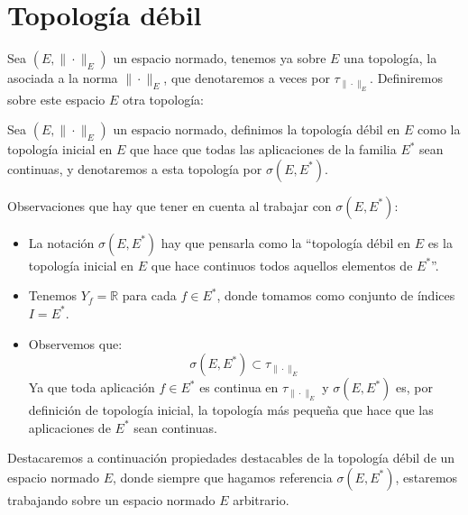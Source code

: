\section{Topología débil}
\noindent
Sea $(E,\|\cdot \|_E)$ un espacio normado, tenemos ya sobre $E$ una topología, la asociada a la norma $\|\cdot \|_E$, que denotaremos a veces por $\tau_{\|\cdot \|_E}$. Definiremos sobre este espacio $E$ otra topología:

\begin{definicion}
    Sea $(E,\|\cdot \|_E)$ un espacio normado, definimos la topología débil en $E$ como la topología inicial en $E$ que hace que todas las aplicaciones de la familia $E^\ast$ sean continuas, y denotaremos a esta topología por $\sigma(E,E^\ast)$.
\end{definicion}

\begin{observacion}
    Observaciones que hay que tener en cuenta al trabajar con $\sigma(E,E^\ast)$:
    \begin{itemize}
        \item La notación $\sigma(E,E^\ast)$ hay que pensarla como la ``topología débil en $E$ es la topología inicial en $E$ que hace continuos todos aquellos elementos de $E^\ast$''.
        \item Tenemos $Y_f = \mathbb{R}$ para cada $f\in E^\ast$, donde tomamos como conjunto de índices $I = E^\ast$.
        \item Observemos que:
            \begin{equation*}
                \sigma(E,E^\ast) \subset \tau_{\|\cdot \|_E}
            \end{equation*}
            Ya que toda aplicación $f\in E^\ast$ es continua en $\tau_{\|\cdot \|_E}$ y $\sigma(E,E^\ast)$ es, por definición de topología inicial, la topología más pequeña que hace que las aplicaciones de $E^\ast$ sean continuas.
    \end{itemize}
\end{observacion}

\noindent
Destacaremos a continuación propiedades destacables de la topología débil de un espacio normado $E$, donde siempre que hagamos referencia $\sigma(E,E^\ast)$, estaremos trabajando sobre un espacio normado $E$ arbitrario.

